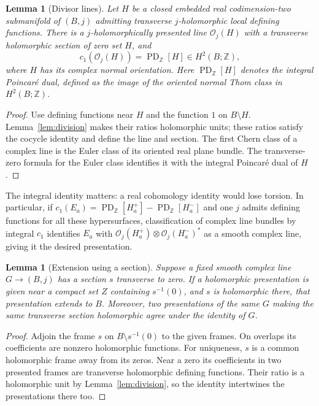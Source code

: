 \documentclass[11pt]{article}
\newtheorem{lemma}[theorem]{Lemma}
\theoremstyle{definition}
\theoremstyle{remark}
\newcommand{\Z}{\mathbb Z}
\newcommand{\PD}{\operatorname{PD}_{\Z}}
\newcommand{\cO}{\mathcal O}
\begin{document}
\begin{lemma}[Divisor lines]\label{lem:divisorline}
Let $H$ be a closed embedded real codimension-two submanifold of $(B,j)$ admitting transverse $j$-holomorphic local defining functions. There is a $j$-holomorphically presented line $\cO_j(H)$ with a transverse holomorphic section of zero set $H$, and
\[
 c_1(\cO_j(H))=\PD[H]\in H^2(B;\Z),
\]
where $H$ has its complex normal orientation. Here $\PD[H]$ denotes the integral Poincar\'e dual, defined as the image of the oriented normal Thom class in $H^2(B;\Z)$.
\end{lemma}
\begin{proof}
Use defining functions near $H$ and the function $1$ on $B\setminus H$. Lemma~\ref{lem:division} makes their ratios holomorphic units; these ratios satisfy the cocycle identity and define the line and section. The first Chern class of a complex line is the Euler class of its oriented real plane bundle. The transverse-zero formula for the Euler class identifies it with the integral Poincar\'e dual of $H$.
\end{proof}
The integral identity matters: a real cohomology identity would lose torsion. In particular, if
$c_1(E_a)=\PD[H_a^+]-\PD[H_a^-]$ and one $j$ admits defining functions for all these hypersurfaces, classification of complex line bundles by integral $c_1$ identifies $E_a$ with
$\cO_j(H_a^+)\otimes\cO_j(H_a^-)^*$ as a smooth complex line, giving it the desired presentation.

\begin{lemma}[Extension using a section]\label{lem:section}
Suppose a fixed smooth complex line $G\to(B,j)$ has a section $s$ transverse to zero. If a holomorphic presentation is given near a compact set $Z$ containing $s^{-1}(0)$, and $s$ is holomorphic there, that presentation extends to $B$. Moreover, two presentations of the same $G$ making the same transverse section holomorphic agree under the identity of $G$.
\end{lemma}
\begin{proof}
Adjoin the frame $s$ on $B\setminus s^{-1}(0)$ to the given frames. On overlaps its coefficients are nonzero holomorphic functions. For uniqueness, $s$ is a common holomorphic frame away from its zeros. Near a zero its coefficients in two presented frames are transverse holomorphic defining functions. Their ratio is a holomorphic unit by Lemma~\ref{lem:division}, so the identity intertwines the presentations there too.
\end{proof}
\end{document}
